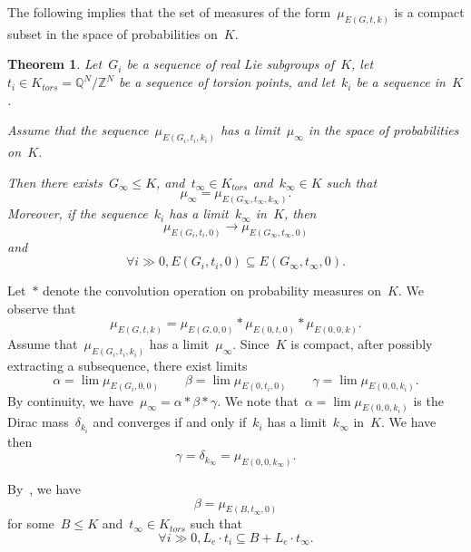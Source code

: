 \documentclass[12pt]{amsart}
\newtheorem{theorem}{Theorem}[section]
\newcommand{\Z}{{\mathbb Z}}
\newcommand{\Q}{{\mathbb Q}}
\begin{document}
The following implies that the set of measures of the form~$\mu_{E(G,t,k)}$ is a compact subset in the space of probabilities on~$K$.
\begin{theorem}\label{thm:equi}
Let~$G_i$ be a sequence of real Lie subgroups of~$K$, let~$t_i\in K_{tors}=\Q^N/\Z^N$ be
a sequence of torsion points, and let~$k_i$ be a sequence in~$K$.

Assume that the sequence~$\mu_{E(G_i,t_i,k_i)}$ has a limit~$\mu_\infty$ in the space of probabilities on~$K$.

Then there exists~$G_\infty\leq K$, and~$t_\infty\in K_{tors}$ and~$k_\infty\in K$ such that
\[
\mu_\infty=\mu_{E(G_\infty,t_\infty,k_\infty)}.
\]
Moreover, if the sequence~$k_i$ has a limit~$k_\infty$ in~$K$, then
\[
\mu_{E(G_i,t_i,0)}\to \mu_{E(G_\infty,t_\infty,0)}
\]
and
\[
\forall i\gg0, E(G_i,t_i,0)\subseteq E(G_\infty,t_\infty,0).
\]
\end{theorem}

Let~$\ast$ denote the convolution operation on probability measures on~$K$.
We observe that
\[
\mu_{E(G,t,k)}=
\mu_{E(G,0,0)}
\ast
\mu_{E(0,t,0)}
\ast
\mu_{E(0,0,k)}.
\]
Assume that~$\mu_{E(G_i,t_i,k_i)}$ has a limit~$\mu_\infty$. Since~$K$ is compact,
after possibly extracting a subsequence, there exist limits
\[
\alpha=\lim \mu_{E(G_i,0,0)}\qquad
\beta=\lim \mu_{E(0,t_i,0)}\qquad
\gamma=\lim \mu_{E(0,0,k_i)}.
\]
By continuity, we have~$\mu_\infty=\alpha\ast\beta\ast\gamma$. We note that~$
\alpha=\lim \mu_{E(0,0,k_i)}$ is the Dirac mass~$\delta_{k_i}$ and converges if and only if~$k_i$
has a limit~$k_\infty$ in~$K$. We have then
\[
\gamma=\delta_{k_{\infty}}=\mu_{E(0,0,k_\infty)}.
\]

By~\cite{RWeyl}, we have
\[
\beta=\mu_{E(B,t_\infty,0)}
\]
for some~$B\leq K$ and~$t_\infty\in K_{tors}$ such that
\[
\forall i\gg0, L_e\cdot t_i\subseteq B+L_e\cdot t_\infty.
\]
\end{document}
